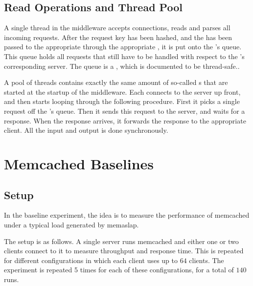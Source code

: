 \documentclass[11pt]{article}
\begin{document}
\subsection{Read Operations and Thread Pool}\label{sec:desc:reads}

%

A single thread in the middleware accepts connections, reads and parses all incoming requests.
After the request key has been hashed, and the  has been passed to the appropriate  through the appropriate , it is put onto the 's queue.
This queue holds all requests that still have to be handled with respect to the 's corresponding server.
The queue is a , which is documented to be thread-safe.\cite{javaBlockingQueueSafe}.

A pool of threads contains exactly the same amount of so-called s that are started at the startup of the middleware.
Each  connects to the server up front, and then starts looping through the following procedure.
First it picks a single request off the 's queue.
Then it sends this request to the server, and waits for a response.
When the response arrives, it forwards the response to the appropriate client.
All the input and output is done synchronously.


\section{Memcached Baselines}\label{sec:baseline}

\subsection{Setup}


In the baseline experiment, the idea is to measure the performance of memcached under a typical load generated by memaslap.

The setup is as follows.
A single server runs memcached and either one or two clients connect to it to measure throughput and response time.
This is repeated for different configurations in which each client uses up to $64$ clients.
The experiment is repeated 5 times for each of these configurations, for a total of $140$ runs.
\end{document}
